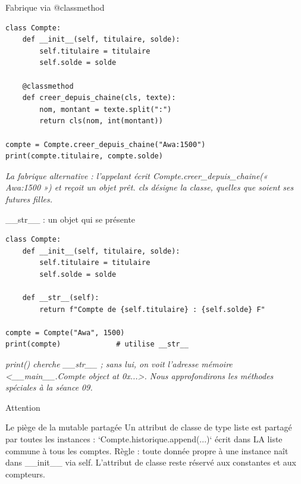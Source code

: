 \documentclass[aspectratio=169,11pt]{beamer}
\begin{document}
\begin{frame}[fragile]{Fabrique via @classmethod}

\begin{lstlisting}[style=py]
class Compte:
    def __init__(self, titulaire, solde):
        self.titulaire = titulaire
        self.solde = solde

    @classmethod
    def creer_depuis_chaine(cls, texte):
        nom, montant = texte.split(":")
        return cls(nom, int(montant))

compte = Compte.creer_depuis_chaine("Awa:1500")
print(compte.titulaire, compte.solde)
\end{lstlisting}
\vspace{0.5pt}

{\small\color{PyGris}\itshape La fabrique alternative : l'appelant écrit Compte.creer\_depuis\_chaine(« Awa:1500 ») et reçoit un objet prêt. cls désigne la classe, quelles que soient ses futures filles.}

\end{frame}

\begin{frame}[fragile]{\_\_str\_\_ : un objet qui se présente}

\begin{lstlisting}[style=py]
class Compte:
    def __init__(self, titulaire, solde):
        self.titulaire = titulaire
        self.solde = solde

    def __str__(self):
        return f"Compte de {self.titulaire} : {self.solde} F"

compte = Compte("Awa", 1500)
print(compte)             # utilise __str__
\end{lstlisting}
\vspace{0.5pt}

{\small\color{PyGris}\itshape print() cherche \_\_str\_\_ ; sans lui, on voit l'adresse mémoire <\_\_main\_\_.Compte object at 0x...>. Nous approfondirons les méthodes spéciales à la séance 09.}

\end{frame}

\begin{frame}{Attention}
\begin{alertblock}{Le piège de la mutable partagée}
Un attribut de classe de type liste est partagé par toutes les instances : `Compte.historique.append(...)` écrit dans LA liste commune à tous les comptes. Règle : toute donnée propre à une instance naît dans \_\_init\_\_ via self. L'attribut de classe reste réservé aux constantes et aux compteurs.
\end{alertblock}
\end{frame}
\end{document}
